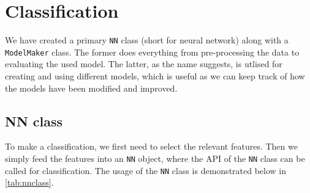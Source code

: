 

%
%

\section{Classification}
We have created a primary \verb|NN| class (short for neural network) along with a \verb|ModelMaker| class. The former does everything from pre-processing the data to evaluating the used model. The latter, as the name suggests, is utlised for creating and using different models, which is useful as we can keep track of how the models have been modified and improved. 

\subsection{NN class}
To make a classification, we first need to select the relevant features. Then we simply feed the features into an \verb|NN| object, where the API of the \verb|NN| class can be called for classification. The usage of the \verb|NN| class is demonstrated below in \ref{tab:nnclass}.


